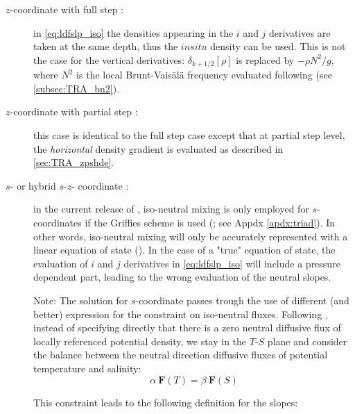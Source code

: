 \documentclass[../tex_main/NEMO_manual]{subfiles}
\begin{document}
\begin{description}

\item[$z$-coordinate with full step : ] in \autoref{eq:ldfslp_iso} the densities 
appearing in the $i$ and $j$ derivatives  are taken at the same depth, thus 
the $in situ$ density can be used. This is not the case for the vertical 
derivatives: $\delta_{k+1/2}[\rho]$ is replaced by $-\rho N^2/g$, where $N^2$ 
is the local Brunt-Vais\"{a}l\"{a} frequency evaluated following 
\citet{McDougall1987} (see \autoref{subsec:TRA_bn2}). 

\item[$z$-coordinate with partial step : ] this case is identical to the full step 
case except that at partial step level, the \emph{horizontal} density gradient 
is evaluated as described in \autoref{sec:TRA_zpshde}.

\item[$s$- or hybrid $s$-$z$- coordinate : ] in the current release of \NEMO, 
iso-neutral mixing is only employed for $s$-coordinates if the
Griffies scheme is used (; see Appdx \autoref{apdx:triad}). 
In other words, iso-neutral mixing will only be accurately represented with a 
linear equation of state (). In the case of a "true" equation 
of state, the evaluation of $i$ and $j$ derivatives in \autoref{eq:ldfslp_iso} 
will include a pressure dependent part, leading to the wrong evaluation of 
the neutral slopes.

Note: The solution for $s$-coordinate passes trough the use of different 
(and better) expression for the constraint on iso-neutral fluxes. Following 
\citet{Griffies_Bk04}, instead of specifying directly that there is a zero neutral 
diffusive flux of locally referenced potential density, we stay in the $T$-$S$ 
plane and consider the balance between the neutral direction diffusive fluxes 
of potential temperature and salinity:
\begin{equation}
\alpha \ \textbf{F}(T) = \beta \ \textbf{F}(S)
\end{equation}

This constraint leads to the following definition for the slopes:


\end{description}
\end{document}

